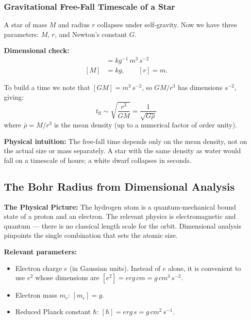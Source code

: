 \subsubsection*{Gravitational Free-Fall Timescale of a Star}
A star of mass $M$ and radius $r$ collapses under self-gravity.  Now we have
three parameters: $M$, $r$, and Newton's constant $G$.

\textbf{Dimensional check:}
\begin{align*}
    [G] &= \si{kg^{-1}\,m^3\,s^{-2}} \\
    [M] &= \si{kg}, \qquad [r] = \si{m}.
\end{align*}

To build a time we note that $[GM] = \si{m^3\,s^{-2}}$, so $GM/r^3$ has
dimensions $\si{s^{-2}}$, giving:
\[
    \boxed{t_\text{ff} \sim \sqrt{\frac{r^3}{GM}} = \frac{1}{\sqrt{G\bar{\rho}}}}
\]
where $\bar{\rho} = M/r^3$ is the mean density (up to a numerical factor of
order unity).

\noindent\textbf{Physical intuition:} The free-fall time depends only on the
mean density, not on the actual size or mass separately. A star with the same
density as water would fall on a timescale of hours; a white dwarf collapses in
seconds.

\subsection{The Bohr Radius from Dimensional Analysis}

\textbf{The Physical Picture:}
The hydrogen atom is a quantum-mechanical bound state of a proton and an
electron. The relevant physics is electromagnetic and quantum — there is no
classical length scale for the orbit. Dimensional analysis pinpoints the
single combination that sets the atomic size.

\textbf{Relevant parameters:}
\begin{itemize}
    \item Electron charge $e$ (in Gaussian units).  Instead of $e$ alone, it
    is convenient to use $e^2$ whose dimensions are
    $[e^2] = \si{erg\,cm} = \si{g\,cm^3\,s^{-2}}$.
    \item Electron mass $m_e$: $[m_e] = \si{g}$.
    \item Reduced Planck constant $\hbar$: $[\hbar] = \si{erg\,s} =
    \si{g\,cm^2\,s^{-1}}$.
\end{itemize}

